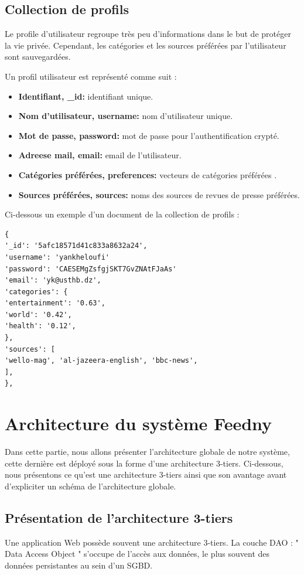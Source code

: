 \subsection{Collection de profils}
Le profile d'utilisateur regroupe très peu d'informations dans le but de protéger la vie privée. Cependant, les catégories et les sources préférées par l'utilisateur sont sauvegardées. 

Un profil utilisateur est représenté comme suit :
\begin{itemize}
    \item \textbf{Identifiant, \textquotedbl  \_id\textquotedbl : } identifiant unique.
    \item \textbf{Nom d'utilisateur, \textquotedbl  username\textquotedbl : } nom d'utilisateur unique.
    \item \textbf{Mot de passe, \textquotedbl  password\textquotedbl : } mot de passe pour l'authentification crypté.
    \item \textbf{Adreese mail, \textquotedbl  email\textquotedbl : } email de l'utilisateur.
    \item \textbf{Catégories préférées, \textquotedbl  preferences\textquotedbl : } vecteurs de catégories préférées .
    \item \textbf{Sources préférées, \textquotedbl  sources\textquotedbl : } noms des sources de revues de presse préférées. 
\end{itemize}

Ci-dessous un exemple d'un document de la collection de profils :
\begin{lstlisting}[style=code]
{
'_id': '5afc18571d41c833a8632a24', 
'username': 'yankheloufi'
'password': 'CAESEMgZsfgjSKT7GvZNAtFJaAs'
'email': 'yk@usthb.dz',
'categories': {
'entertainment': '0.63',
'world': '0.42',
'health': '0.12',
},
'sources': [
'wello-mag', 'al-jazeera-english', 'bbc-news', 
],
},
\end{lstlisting}


\section{Architecture du système \textquotedbl Feedny\textquotedbl}
Dans cette partie, nous allons présenter l'architecture globale de notre système, cette dernière est déployé sous la forme d'une architecture 3-tiers. Ci-dessous, nous présentons ce qu'est une architecture 3-tiers ainsi que son avantage avant d'expliciter un schéma de l'architecture globale.

\subsection{Présentation de l'architecture 3-tiers}
Une application Web possède souvent une architecture 3-tiers.
La couche DAO : " Data Access Object " s'occupe de l'accès aux données, le plus souvent des
données persistantes au sein d'un SGBD.

